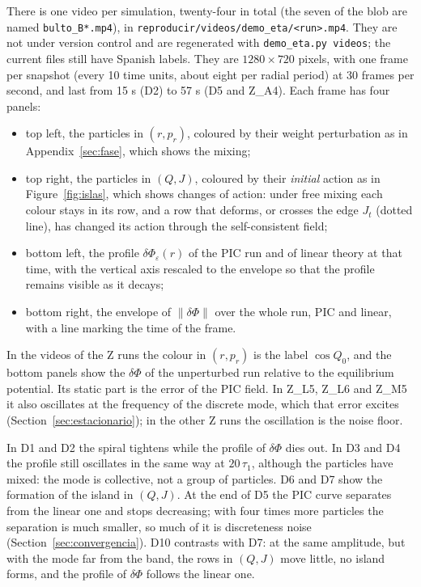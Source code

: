 \documentclass[11pt,a4paper]{article}
\begin{document}
There is one video per simulation, twenty-four in total (the seven of the blob are named
\texttt{bulto\_B*.mp4}), in
\texttt{reproducir/\allowbreak videos/\allowbreak demo\_\allowbreak eta/\allowbreak <run>.mp4}. They are not under version control and are
regenerated with \texttt{demo\_eta.py videos}; the current files still have Spanish labels.
They are $1280\times720$ pixels, with one frame per snapshot (every 10 time units, about
eight per radial period) at 30 frames per second, and last from 15 s (D2) to 57 s (D5 and
Z\_A4). Each frame has four panels:
\begin{itemize}
\item top left, the particles in $(r,p_r)$, coloured by their weight perturbation as in
Appendix~\ref{sec:fase}, which shows the mixing;
\item top right, the particles in $(Q,J)$, coloured by their \emph{initial} action as in
Figure~\ref{fig:islas}, which shows changes of action: under free mixing each colour stays
in its row, and a row that deforms, or crosses the edge $J_t$ (dotted line), has changed
its action through the self-consistent field;
\item bottom left, the profile $\delta\Phi_\varepsilon(r)$ of the PIC run and of linear theory
at that time, with the vertical axis rescaled to the envelope so that the profile remains
visible as it decays;
\item bottom right, the envelope of $\|\delta\Phi\|$ over the whole run, PIC and linear, with
a line marking the time of the frame.
\end{itemize}
In the videos of the Z runs the colour in $(r,p_r)$ is the label $\cos Q_0$, and the bottom
panels show the $\delta\Phi$ of the unperturbed run relative to the equilibrium potential. Its
static part is the error of the PIC field. In Z\_L5, Z\_L6 and Z\_M5 it also oscillates at the
frequency of the discrete mode, which that error excites (Section~\ref{sec:estacionario}); in
the other Z runs the oscillation is the noise floor.

In D1 and D2 the spiral tightens while the profile of $\delta\Phi$ dies out. In D3 and D4 the
profile still oscillates in the same way at $20\,\tau_1$, although the particles have mixed:
the mode is collective, not a group of particles. D6 and D7 show the formation of the
island in $(Q,J)$. At the end of D5 the PIC curve separates from the linear one and stops
decreasing; with four times more particles the separation is much smaller, so much of it
is discreteness noise (Section~\ref{sec:convergencia}). D10 contrasts with D7: at the same
amplitude, but with the mode far from the band, the rows in $(Q,J)$ move little, no island
forms, and the profile of $\delta\Phi$ follows the linear one.
\end{document}
